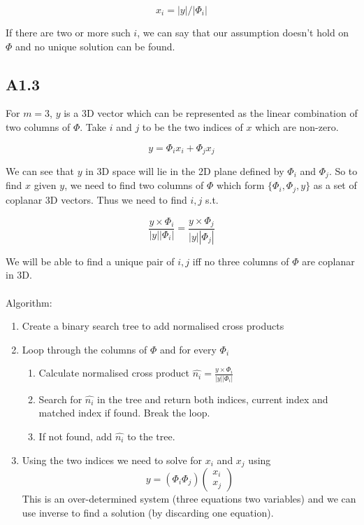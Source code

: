 \documentclass{article}
\begin{document}
$$x_i = |y|/|\Phi_i| $$

If there are two or more such $i$, we can say that our assumption doesn't hold on $\Phi$ and
no unique solution can be found.

\subsection*{A1.3}

For $m=3$, $y$ is a 3D vector which can be represented as the linear combination
of two columns of $\Phi$. Take $i$ and $j$ to be the two indices of $x$ which are
non-zero.

$$ y = \Phi_i x_i + \Phi_j x_j $$

We can see that $y$ in 3D space will lie in the 2D plane defined by $\Phi_i$ and
$\Phi_j$. So to find $x$ given $y$, we need to find two columns of $\Phi$ which form
$\{\Phi_i,\Phi_j,y\}$ as a set of coplanar 3D vectors. Thus we need to find $i,j$ s.t.

$$ \frac{y\times\Phi_i}{|y||\Phi_i|} = \frac{y\times\Phi_j}{|y||\Phi_j|} $$

We will be able to find a unique pair of $i,j$ iff no three columns of $\Phi$ are coplanar
in 3D.
\\
\\
Algorithm:
\begin{enumerate}
    \item{Create a binary search tree to add normalised cross products}
    \item{Loop through the columns of $\Phi$ and for every $\Phi_i$
    \begin{enumerate}
        \item{Calculate normalised cross product $\hat{n_i} =  \frac{y\times\Phi_i}{|y||\Phi_i|}$}
        \item{Search for $\hat{n_i}$ in the tree and return both indices,
            current index and matched index if found. Break the loop.}
        \item{If not found, add $\hat{n_i}$ to the tree.}
    \end{enumerate}
    }
    \item{Using the two indices we need to solve for $x_i$ and $x_j$ using 
          $$y = (\Phi_i \Phi_j)\left(\begin{array}{c} x_i\\ x_j \end{array}\right) $$
          This is an over-determined system (three equations two variables)
          and we can use inverse to find a solution (by discarding one equation).}
\end{enumerate}
\end{document}
